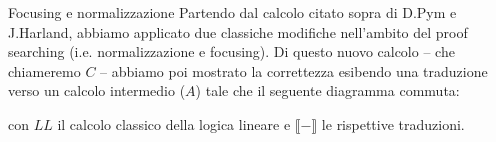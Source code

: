 \documentclass{beamer}
\begin{document}
% 

\begin{frame}{Focusing e normalizzazione}
	Partendo dal calcolo citato sopra di D.Pym e J.Harland, abbiamo applicato due classiche modifiche nell'ambito del proof searching (i.e. normalizzazione e focusing).
	Di questo nuovo calcolo -- che chiameremo $C$ -- abbiamo poi mostrato la correttezza esibendo una traduzione verso un calcolo intermedio ($A$) tale che il seguente diagramma commuta:
	\begin{center}
	\end{center}
	con $LL$ il calcolo classico della logica lineare e $\llbracket - \rrbracket$ le rispettive traduzioni.
\end{frame}
\end{document}
